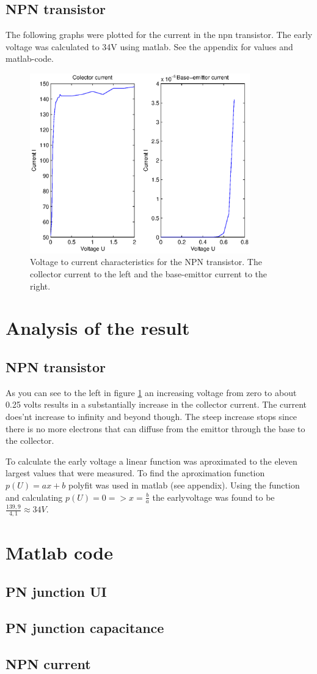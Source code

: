 \documentclass[a4paper]{article}
\begin{document}
\subsection{NPN transistor}
The following graphs were plotted for the current in the npn transistor. The early voltage was calculated to 34V using matlab. See the appendix for values and matlab-code.
\begin{figure}[H]
	\centering
	\includegraphics[width=0.85\textwidth]{npn.eps}
	\caption{Voltage to current characteristics for the NPN transistor. The collector current to the left and the base-emittor current to the right.}	
	\label{npn}
\end{figure}

\newpage
\section{Analysis of the result}
\subsection{NPN transistor}
As you can see to the left in figure \ref{npn} an increasing voltage from zero to about 0.25 volts results in a substantially increase in the collector current. The current does'nt increase to infinity and beyond though. The steep increase stops since there is no more electrons that can diffuse from the emittor through the base to the collector.

To calculate the early voltage a linear function was aproximated to the eleven largest values that were measured. To find the aproximation function $p(U) = ax + b$ polyfit was used in matlab (see appendix). Using the function and calculating $p(U) = 0 => x = \frac{b}{a}$ the earlyvoltage was found to be $\frac{139,9}{4,1} \approx 34V$.

\newpage
\appendix
\section{Matlab code}
\subsection{PN junction UI}

\subsection{PN junction capacitance}

\subsection{NPN current}

\end{document}
